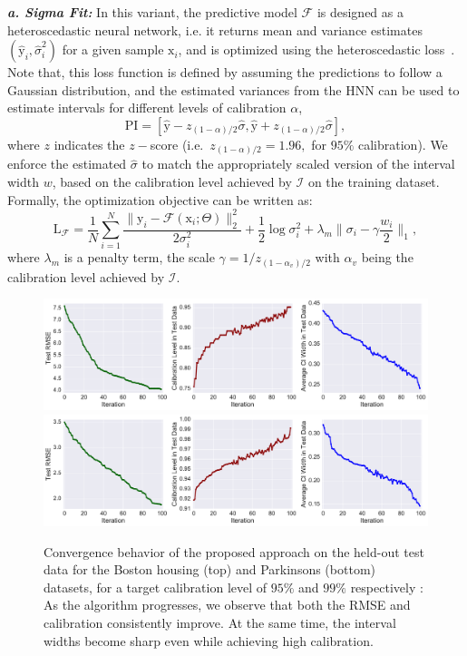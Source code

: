 \documentclass[letterpaper]{article} %
\begin{document}
\noindent \textit{\textbf{a. Sigma Fit:}} In this variant, the predictive model $\mathcal{F}$ is designed as a heteroscedastic neural network, i.e. it returns mean and variance estimates $(\hat{\mathrm{y}}_i, \hat{\sigma}^2_i)$ for a given sample $\mathrm{x}_i$, and is optimized using the heteroscedastic loss~\cite{gal2016uncertainty}. Note that, this loss function is defined by assuming the predictions to follow a Gaussian distribution, and the estimated variances from the HNN can be used to estimate intervals for different levels of calibration $\alpha$,
\begin{equation}
\text{PI} = [\hat{\mathrm{y}} - z_{(1-\alpha)/2}\hat{\sigma}, \hat{\mathrm{y}} + z_{(1-\alpha)/2}\hat{\sigma}],
\end{equation} where $z$ indicates the $z-$score (i.e.\ $z_{(1-\alpha)/2} = 1.96,$ for $95\%$ calibration). We enforce the estimated $\hat{\sigma}$ to match the  appropriately scaled version of the interval width $w$, based on the calibration level achieved by $\mathcal{I}$ on the training dataset. Formally, the optimization objective can be written as:
\begin{equation} \label{bnn matching}
\mathrm{L}_{\mathcal{F}} =  \frac{1}{N} \sum_{i=1}^N \frac{\|\mathrm{y}_i - \mathcal{F}(\mathrm{x}_i;\Theta)\|_2^2}{2\sigma_i^2}  + \frac{1}{2}\log \sigma_i^2 + \lambda_m \|\sigma_i - \gamma \frac{w_i}{2}\|_1,
\end{equation}where $\lambda_m$ is a penalty term, the scale $\gamma = 1/z_{(1-\alpha_v)/2}$ with $\alpha_v$ being the calibration level achieved by $\mathcal{I}$.


\begin{figure}[t]
	\centering
	\includegraphics[width=1.\linewidth]{boston-iter.pdf}
	\includegraphics[width=1.\linewidth]{parkinsons-iter.pdf}
	\caption{Convergence behavior of the proposed approach on the held-out test data for the Boston housing (top) and Parkinsons (bottom) datasets, for a target calibration level of $95\%$ and $99\%$ respectively : As the algorithm progresses, we observe that both the RMSE and calibration consistently improve. At the same time, the interval widths become sharp even while achieving high calibration.}
	\label{fig:boston-iter}
\end{figure}
\end{document}
